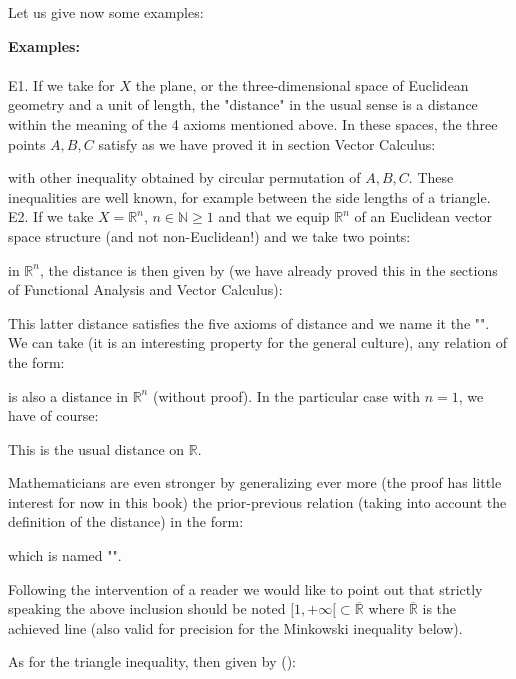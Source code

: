 	\pagebreak
	Let us give now some examples:
	\begin{tcolorbox}[colframe=black,colback=white,sharp corners]
	\textbf{{\Large {}}Examples:}\\\\
	E1. If we take for $X$ the plane, or the three-dimensional space of Euclidean geometry and a unit of length, the "distance" in the usual sense is a distance within the meaning of the 4 axioms mentioned above. In these spaces, the three points $A, B, C$ satisfy as we have proved it in section Vector Calculus:
	
	with other inequality obtained by circular permutation of $A, B, C$. These inequalities are well known, for example between the side lengths of a triangle.\\
	
	E2. If we take $X=\mathbb{R}^n$, $n \in \mathbb{N} \geq 1$ and that we equip $\mathbb{R}^n$ of an Euclidean vector space structure (and not non-Euclidean!) and we take two points:
	
	in $\mathbb{R}^n$, the distance is then given by (we have already proved this in the sections of Functional Analysis and Vector Calculus):
	
	\end{tcolorbox}
	This latter distance satisfies the five axioms of distance and we name it the "". We can take (it is an interesting property for the general culture), any relation of the form:
	
	is also a distance in $\mathbb{R}^n$ (without proof). In the particular case with $n=1$, we have of course:
	
	This is the usual distance on $\mathbb{R}$.
	
	Mathematicians are even stronger by generalizing ever more (the proof has little interest for now in this book) the prior-previous relation (taking into account the definition of the distance) in the form:
	
	which is named "".
	\begin{tcolorbox}[title=Remarks,colframe=black,arc=10pt]
	Following the intervention of a reader we would like to point out that strictly speaking the above inclusion should be noted $[1,+\infty[ \subset \mathbb{\overline{R}}$ where $\mathbb{\overline{R}}$ is the achieved line (also valid for precision for the Minkowski inequality below).
	\end{tcolorbox}	
	As for the triangle inequality, then given by ():
	
